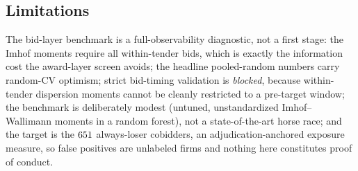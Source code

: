 \subsection{Limitations}
\label{app:bid_limitations_submission}

The bid-layer benchmark is a full-observability diagnostic, not a first
stage: the Imhof moments require all within-tender bids, which is exactly
the information cost the award-layer screen avoids; the headline
pooled-random numbers carry random-CV optimism; strict bid-timing
validation is \emph{blocked}, because within-tender dispersion moments
cannot be cleanly restricted to a pre-target window; the benchmark is
deliberately modest (untuned, unstandardized Imhof--Wallimann moments in a
random forest), not a state-of-the-art horse race; and the target is the
$651$ always-loser cobidders, an adjudication-anchored
exposure measure, so false positives are unlabeled firms and nothing here
constitutes proof of conduct.
